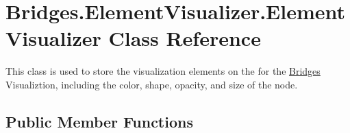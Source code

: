 \hypertarget{class_bridges_1_1_element_visualizer_1_1_element_visualizer}{}\section{Bridges.\+Element\+Visualizer.\+Element\+Visualizer Class Reference}
\label{class_bridges_1_1_element_visualizer_1_1_element_visualizer}


This class is used to store the visualization elements on the for the \hyperlink{namespace_bridges_1_1_bridges}{Bridges} Visualiztion, including the color, shape, opacity, and size of the node.  


\subsection*{Public Member Functions}
